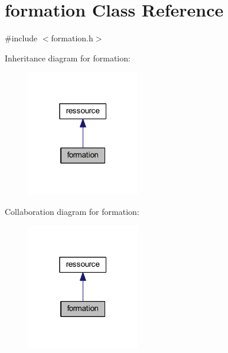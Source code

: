\hypertarget{classformation}{}\section{formation Class Reference}
\label{classformation}


{\ttfamily \#include $<$formation.\+h$>$}



Inheritance diagram for formation\+:\nopagebreak
\begin{figure}[H]
\begin{center}
\leavevmode
\includegraphics[width=139pt]{classformation__inherit__graph}
\end{center}
\end{figure}


Collaboration diagram for formation\+:\nopagebreak
\begin{figure}[H]
\begin{center}
\leavevmode
\includegraphics[width=139pt]{classformation__coll__graph}
\end{center}
\end{figure}
